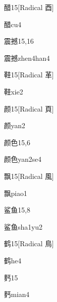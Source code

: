 \begin{entry}{醋}{15}[Radical ⾣]
  \begin{phonetics}{醋}{cu4}
  \end{phonetics}
\end{entry}

\begin{entry}{震撼}{15,16}
  \begin{phonetics}{震撼}{zhen4han4}
  \end{phonetics}
\end{entry}

\begin{entry}{鞋}{15}[Radical 革]
  \begin{phonetics}{鞋}{xie2}
  \end{phonetics}
\end{entry}

\begin{entry}{颜}{15}[Radical 頁]
  \begin{phonetics}{颜}{yan2}
  \end{phonetics}
\end{entry}

\begin{entry}{颜色}{15,6}
  \begin{phonetics}{颜色}{yan2se4}
  \end{phonetics}
\end{entry}

\begin{entry}{飘}{15}[Radical 風]
  \begin{phonetics}{飘}{piao1}
  \end{phonetics}
\end{entry}

\begin{entry}{鲨鱼}{15,8}
  \begin{phonetics}{鲨鱼}{sha1yu2}
  \end{phonetics}
\end{entry}

\begin{entry}{鹤}{15}[Radical 鳥]
  \begin{phonetics}{鹤}{he4}
  \end{phonetics}
\end{entry}

\begin{entry}{麫}{15}
  \begin{phonetics}{麫}{mian4}
  \end{phonetics}
\end{entry}


